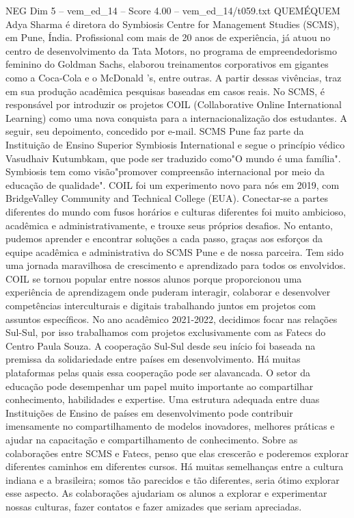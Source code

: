 \begin{textsample}{NEG Dim 5 – vem\_ed\_14 – Score 4.00 – vem\_ed\_14/t059.txt}  \label{ex:f5_neg_015}
QUEMÉQUEM Adya Sharma é diretora do Symbiosis Centre for Management Studies (SCMS), em Pune, Índia.
Profissional com mais de 20 anos de experiência, já atuou no centro de desenvolvimento da Tata Motors, no programa de empreendedorismo feminino do Goldman Sachs, elaborou treinamentos corporativos em gigantes como a Coca-Cola e o McDonald 's, entre outras.
A partir dessas vivências, traz em sua produção acadêmica pesquisas baseadas em casos reais.
No SCMS, é responsável por introduzir os projetos COIL (Collaborative Online International Learning) como uma nova conquista para a internacionalização dos estudantes.
A seguir, seu depoimento, concedido por e-mail.
SCMS Pune faz parte da Instituição de Ensino Superior Symbiosis International e segue o princípio védico Vasudhaiv Kutumbkam, que pode ser traduzido como"O mundo é uma família".
Symbiosis tem como visão"promover compreensão internacional por meio da educação de qualidade".
COIL foi um experimento novo para nós em 2019, com BridgeValley Community and Technical College (EUA).
Conectar-se a partes diferentes do mundo com fusos horários e culturas diferentes foi muito ambicioso, acadêmica e administrativamente, e trouxe seus próprios desafios.
No entanto, pudemos aprender e encontrar soluções a cada passo, graças aos esforços da equipe acadêmica e administrativa do SCMS Pune e de nossa parceira.
Tem sido uma jornada maravilhosa de crescimento e aprendizado para todos os envolvidos.
COIL se tornou popular entre nossos alunos porque proporcionou uma experiência de aprendizagem onde puderam interagir, colaborar e desenvolver competências interculturais e digitais trabalhando juntos em projetos com assuntos específicos.
No ano acadêmico 2021-2022, decidimos focar nas relações Sul-Sul, por isso trabalhamos com projetos exclusivamente com as Fatecs do Centro Paula Souza.
A cooperação Sul-Sul desde seu início foi baseada na premissa da solidariedade entre países em desenvolvimento.
Há muitas plataformas pelas quais essa cooperação pode ser alavancada.
O setor da educação pode desempenhar um papel muito importante ao compartilhar conhecimento, habilidades e expertise.
Uma estrutura adequada entre duas Instituições de Ensino de países em desenvolvimento pode contribuir imensamente no compartilhamento de modelos inovadores, melhores práticas e ajudar na capacitação e compartilhamento de conhecimento.
Sobre as colaborações entre SCMS e Fatecs, penso que elas crescerão e poderemos explorar diferentes caminhos em diferentes cursos.
Há muitas semelhanças entre a cultura indiana e a brasileira; somos tão parecidos e tão diferentes, seria ótimo explorar esse aspecto.
As colaborações ajudariam os alunos a explorar e experimentar nossas culturas, fazer contatos e fazer amizades que seriam apreciadas.

\end{textsample}
